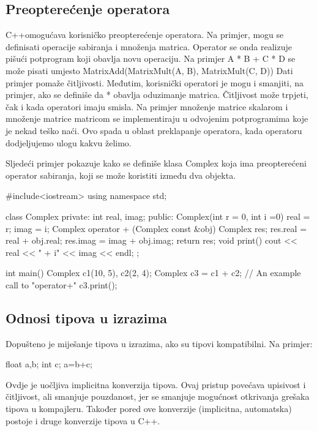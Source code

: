 \documentclass[11pt]{book}
\begin{document}
\subsection{Preopterećenje operatora}

C++omogućava korisničko preopterećenje operatora. Na primjer, mogu se definisati operacije sabiranja i množenja matrica. Operator se onda realizuje pišući potprogram koji obavlja novu operaciju. Na primjer A {*} B + C {*} D se može pisati umjesto MatrixAdd(MatrixMult(A, B), MatrixMult(C, D)) Dati primjer pomaže čitljivosti. Međutim, korisnički operatori je mogu i smanjiti, na primjer, ako se definiše da {*} obavlja
oduzimanje matrica. Čitljivost može trpjeti, čak i kada operatori imaju smisla. Na primjer množenje matrice skalarom i množenje matrice matricom se implementiraju u odvojenim potprogramima koje je nekad teško naći. Ovo spada u oblast preklapanje operatora, kada operatoru dodjeljujemo ulogu kakvu želimo.

Sljedeći primjer pokazuje kako se definiše klasa Complex koja ima preopterećeni operator sabiranja, koji se može koristiti između dva objekta.

\begin{shortlisting}
  #include<iostream>
  using namespace std;

  class Complex {
      private:
      int real, imag;
      public:
      Complex(int r = 0, int i =0)  {real = r;   imag = i;}
      Complex operator + (Complex const &obj) {
          Complex res;
          res.real = real + obj.real;
          res.imag = imag + obj.imag;
          return res;
        }
      void print() { cout << real << " + i" << imag << endl; }
    };

  int main()
    {
      Complex c1(10, 5), c2(2, 4);
      Complex c3 = c1 + c2; // An example call to "operator+"
      c3.print();
    }
\end{shortlisting}

\subsection{Odnosi tipova u izrazima}
Dopušteno je miješanje tipova u izrazima, ako su tipovi kompatibilni. Na primjer:

\begin{shortlisting}
  float a,b;
  int c;
  a=b+c;
\end{shortlisting}

Ovdje je uočljiva implicitna konverzija tipova. Ovaj pristup povećava upisivost i čitljivost, ali smanjuje pouzdanost, jer se smanjuje mogućnost otkrivanja grešaka tipova u kompajleru. Također pored ove konverzije (implicitna, automatska) postoje i druge konverzije tipova u C++.
\end{document}
